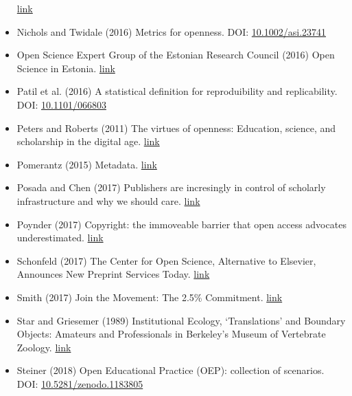 \begin{itemize}
  \href{https://www.nature.com/articles/s41562-016-0021}{link}
\item
  Nichols and Twidale (2016) Metrics for openness. DOI:
  \href{https://doi.org/10.1002/asi.23741}{10.1002/asi.23741}
\item
  Open Science Expert Group of the Estonian Research Council (2016) Open
  Science in Estonia.
  \href{https://www.etag.ee/wp-content/uploads/2017/03/Open-Science-in-Estonia-Principles-and-Recommendations-final.pdf}{link}
\item
  Patil et al. (2016) A statistical definition for reproduibility and
  replicability. DOI:
  \href{https://doi.org/10.1101/066803}{10.1101/066803}
\item
  Peters and Roberts (2011) The virtues of openness: Education, science,
  and scholarship in the digital age.
  \href{https://www.routledge.com/Virtues-of-Openness-Education-Science-and-Scholarship-in-the-Digital/Peters-Roberts/p/book/9781594516863}{link}
\item
  Pomerantz (2015) Metadata.
  \href{https://mitpress.mit.edu/books/metadata}{link}
\item
  Posada and Chen (2017) Publishers are incresingly in control of
  scholarly infrastructure and why we should care.
  \href{http://knowledgegap.org/index.php/sub-projects/rent-seeking-and-financialization-of-the-academic-publishing-industry/preliminary-findings/}{link}
\item
  Poynder (2017) Copyright: the immoveable barrier that open access
  advocates underestimated.
  \href{https://poynder.blogspot.com/2017/02/copyright-immoveable-barrier-that-open.html}{link}
\item
  Schonfeld (2017) The Center for Open Science, Alternative to Elsevier,
  Announces New Preprint Services Today.
  \href{https://sr.ithaka.org/blog/the-center-for-open-science-alternative-to-elsevier-announces-new-preprint-services-today/}{link}
\item
  Smith (2017) Join the Movement: The 2.5\% Commitment.
  \href{https://intheopen.net/2017/09/join-the-movement-the-2-5-commitment/}{link}
\item
  Star and Griesemer (1989) Institutional Ecology, `Translations' and
  Boundary Objects: Amateurs and Professionals in Berkeley's Museum of
  Vertebrate Zoology.
  \href{http://www.lchc.ucsd.edu/MCA/Mail/xmcamail.2012_08.dir/pdfMrgHgzULhA.pdf}{link}
\item
  Steiner (2018) Open Educational Practice (OEP): collection of
  scenarios. DOI:
  \href{https://doi.org/10.5281/zenodo.1183805}{10.5281/zenodo.1183805}

\end{itemize}

